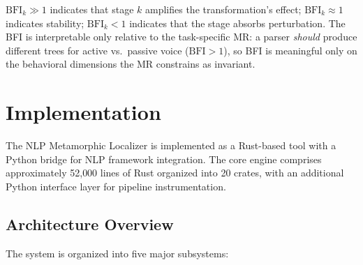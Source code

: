 \documentclass[sigconf,nonacm]{acmart}
\begin{document}
$\mathrm{BFI}_k \gg 1$ indicates that stage $k$ amplifies the transformation's effect; $\mathrm{BFI}_k \approx 1$ indicates stability; $\mathrm{BFI}_k < 1$ indicates that the stage absorbs perturbation.
The BFI is interpretable only relative to the task-specific MR: a parser \emph{should} produce different trees for active vs.\ passive voice ($\mathrm{BFI} > 1$), so BFI is meaningful only on the behavioral dimensions the MR constrains as invariant.

\section{Implementation}\label{sec:implementation}

The NLP Metamorphic Localizer is implemented as a Rust-based tool with a Python bridge for NLP framework integration.
The core engine comprises approximately 52{,}000 lines of Rust organized into 20 crates, with an additional Python interface layer for pipeline instrumentation.

\subsection{Architecture Overview}

The system is organized into five major subsystems:
\end{document}
